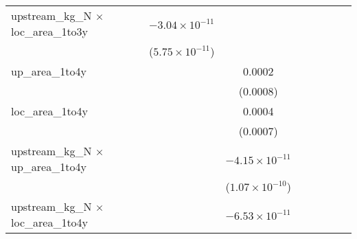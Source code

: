 \begin{tabular}{lcccccccc}
   upstream\_kg\_N $\times$ loc\_area\_1to3y      &                          & $-3.04\times 10^{-11}$   &                          &                          &                          &                          &                          &   \\   
                                                  &                          & ($5.75\times 10^{-11}$)  &                          &                          &                          &                          &                          &   \\   
   up\_area\_1to4y                                &                          &                          & 0.0002                   &                          &                          &                          &                          &   \\   
                                                  &                          &                          & (0.0008)                 &                          &                          &                          &                          &   \\   
   loc\_area\_1to4y                               &                          &                          & 0.0004                   &                          &                          &                          &                          &   \\   
                                                  &                          &                          & (0.0007)                 &                          &                          &                          &                          &   \\   
   upstream\_kg\_N $\times$ up\_area\_1to4y       &                          &                          & $-4.15\times 10^{-11}$   &                          &                          &                          &                          &   \\   
                                                  &                          &                          & ($1.07\times 10^{-10}$)  &                          &                          &                          &                          &   \\   
   upstream\_kg\_N $\times$ loc\_area\_1to4y      &                          &                          & $-6.53\times 10^{-11}$   &                          &                          &                          &                          &   \\   

\end{tabular}
